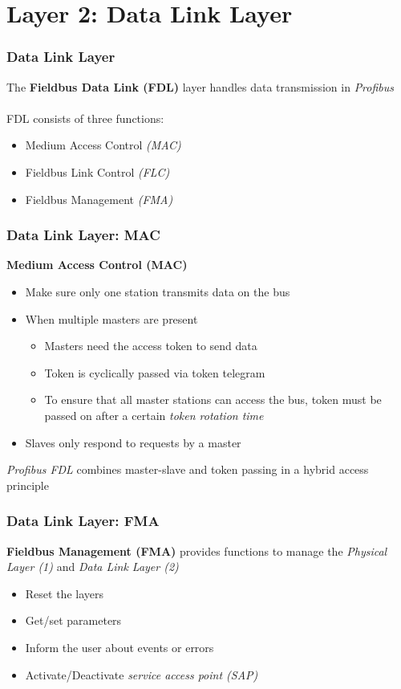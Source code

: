 \documentclass{beamer}
\begin{document}
\section{Layer 2: Data Link Layer}
\begin{frame}
  \frametitle{Data Link Layer}
  The \textbf{Fieldbus Data Link (FDL)} layer handles data transmission in
  \textit{Profibus} \\
  \hfill \\
  FDL consists of three functions:
  \begin{itemize}
    \item Medium Access Control \textit{(MAC)}
    \item Fieldbus Link Control \textit{(FLC)}
    \item Fieldbus Management \textit{(FMA)}
  \end{itemize}
\end{frame}

\begin{frame}
  \frametitle{Data Link Layer: MAC}
  \textbf{Medium Access Control (MAC)}
  \begin{itemize}
    \item Make sure only one station transmits data on the bus
    \item When multiple masters are present
      \begin{itemize}
        \item Masters need the access token to send data
        \item Token is cyclically passed via token telegram
        \item To ensure that all master stations can access the bus, token must be passed
          on after a certain \textit{token rotation time}
      \end{itemize}
    \item Slaves only respond to requests by a master
  \end{itemize}
  \textit{Profibus FDL} combines master-slave and token passing in a hybrid access principle
\end{frame}

\begin{frame}
  \frametitle{Data Link Layer: FMA}
  \textbf{Fieldbus Management (FMA)} provides functions to manage the \textit{Physical
  Layer (1)} and \textit{Data Link Layer (2)}
    \begin{itemize}
      \item Reset the layers
      \item Get/set parameters
      \item Inform the user about events or errors
      \item Activate/Deactivate \textit{service access point (SAP)}
    \end{itemize}
\end{frame}
\end{document}
